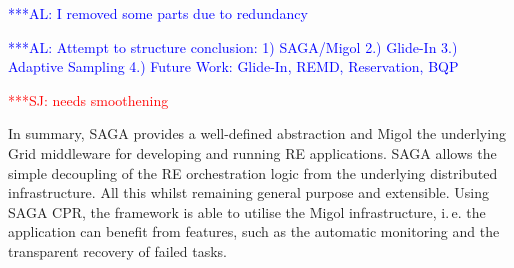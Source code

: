 \documentclass{rspublic}
\newcommand{\alnote}[1]{ {\textcolor{blue} { ***AL: #1 }}}
\newcommand{\jhanote}[1]{ {\textcolor{red} { ***SJ: #1 }}}
\newcommand{\alnote}[1]{}
\newcommand{\jhanote}[1]{}
\begin{document}
\alnote{I removed some parts due to redundancy}
% 
% 




                    
\alnote{Attempt to structure conclusion: 1) SAGA/Migol 2.) Glide-In
  3.) Adaptive Sampling 4.) Future Work: Glide-In, REMD, Reservation,
  BQP}
                                         
\jhanote{needs smoothening} 

In summary, SAGA provides a well-defined abstraction and Migol the
underlying Grid middleware for developing and running RE applications.
SAGA allows the simple decoupling of the RE orchestration logic from
the underlying distributed infrastructure. All this whilst remaining
general purpose and extensible.  Using SAGA CPR, the framework is able
to utilise the Migol infrastructure, i.\,e. the application can
benefit from features, such as the automatic monitoring and the
transparent recovery of failed tasks.
\end{document}
